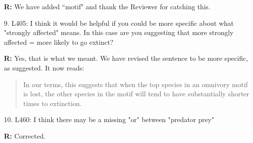 \documentclass[12pt]{article}
\begin{document}
    \smallskip

    \textbf{R:} We have added ``motif" and thank the Reviewer for catching this.

    \smallskip

    9. L405: I think it would be helpful if you could be more specific about what "strongly affected" means. In this case are you suggesting that more strongly affected = more likely to go extinct?


    \smallskip

    \textbf{R:} Yes, that is what we meant. We have revised the sentence to be more specific, as suggested. It now reads:
  
      \begin{quotation}
      In our terms, this suggests that when the top species in an omnivory motif is lost, the other species in the motif will tend to have substantially shorter times to extinction.
      \end{quotation}

    \smallskip

    10. L460: I think there may be a missing "or" between "predator prey"

    \smallskip

    \textbf{R:} Corrected.

    \smallskip

\clearpage


\clearpage
    
 
\end{document}
